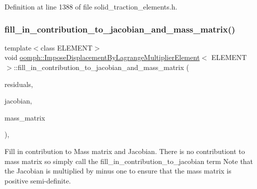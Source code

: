 Definition at line 1388 of file solid\+\_\+traction\+\_\+elements.\+h.

\mbox{\label{classoomph_1_1ImposeDisplacementByLagrangeMultiplierElement_adf4f9f9359fbc7cd2acec4647dfa3c5a}} 
\subsubsection{\texorpdfstring{fill\+\_\+in\+\_\+contribution\+\_\+to\+\_\+jacobian\+\_\+and\+\_\+mass\+\_\+matrix()}{fill\_in\_contribution\_to\_jacobian\_and\_mass\_matrix()}}
{\footnotesize\ttfamily template$<$class E\+L\+E\+M\+E\+NT$>$ \\
void \hyperlink{classoomph_1_1ImposeDisplacementByLagrangeMultiplierElement}{oomph\+::\+Impose\+Displacement\+By\+Lagrange\+Multiplier\+Element}$<$ E\+L\+E\+M\+E\+NT $>$\+::fill\+\_\+in\+\_\+contribution\+\_\+to\+\_\+jacobian\+\_\+and\+\_\+mass\+\_\+matrix (\begin{DoxyParamCaption}\item[{\hyperlink{classoomph_1_1Vector}{Vector}$<$ double $>$ \&}]{residuals,  }\item[{\hyperlink{classoomph_1_1DenseMatrix}{Dense\+Matrix}$<$ double $>$ \&}]{jacobian,  }\item[{\hyperlink{classoomph_1_1DenseMatrix}{Dense\+Matrix}$<$ double $>$ \&}]{mass\+\_\+matrix }\end{DoxyParamCaption})\hspace{0.3cm}{\ttfamily [inline]}, {\ttfamily [virtual]}}



Fill in contribution to Mass matrix and Jacobian. There is no contributiont to mass matrix so simply call the fill\+\_\+in\+\_\+contribution\+\_\+to\+\_\+jacobian term Note that the Jacobian is multiplied by minus one to ensure that the mass matrix is positive semi-\/definite. 



